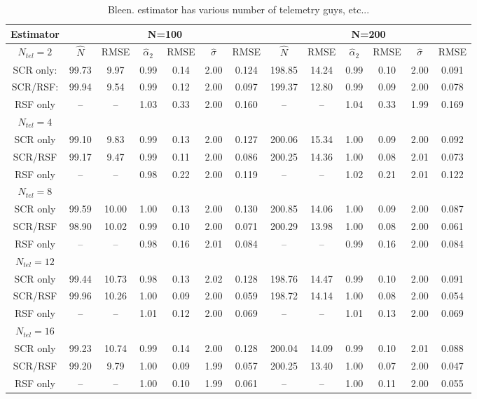 \documentclass[12pt]{article}
\begin{document}
{\tiny
\begin{table}
\centering
\caption{Bleen. estimator has various number of telemetry guys,  etc... }
\begin{tabular}{ccccccccccccc}
\hline \hline
Estimator &  \multicolumn{6}{c}{N=100} & \multicolumn{6}{c}{N=200} \\
\hline 
$N_{tel}=2$       &   $\hat{N}$ & RMSE & $\hat{\alpha}_{2}$& RMSE &
$\hat{\sigma}$ & RMSE & $\hat{N}$ & RMSE & $\hat{\alpha}_{2}$ & RMSE &
$\hat{\sigma}$ & RMSE \\ \hline
SCR only: &  99.73 & 9.97 & 0.99 & 0.14 & 2.00&  0.124& 198.85&14.24&0.99&   0.10& 2.00& 0.091 \\
SCR/RSF:  &  99.94 & 9.54 & 0.99 & 0.12 & 2.00&  0.097& 199.37&12.80&0.99&   0.09& 2.00& 0.078 \\
RSF only  &   --   & --   & 1.03 & 0.33 & 2.00&  0.160&   --  &   --&1.04&   0.33& 1.99& 0.169 \\
$N_{tel}=4$&        &      &      &      &     &       &       &      &    &       &     &      \\
SCR only  &  99.10 & 9.83 & 0.99 & 0.13 & 2.00&  0.127& 200.06& 15.34&1.00&   0.09& 2.00& 0.092\\
SCR/RSF   &  99.17 & 9.47 & 0.99 & 0.11 & 2.00&  0.086& 200.25& 14.36&1.00&   0.08& 2.01& 0.073\\
RSF only  &   --   &  --  & 0.98 & 0.22 & 2.00&  0.119&   --  &  --  &1.02&   0.21& 2.01& 0.122\\
$N_{tel}=8$&        &      &      &      &     &       &       &       &    &        &    &      \\
SCR only  &  99.59 & 10.00& 1.00 & 0.13 & 2.00&  0.130& 200.85& 14.06&1.00&   0.09& 2.00&   0.087\\
SCR/RSF   &  98.90 & 10.02&  0.99&  0.10& 2.00&  0.071& 200.29& 13.98&1.00&   0.08& 2.00&   0.061\\
RSF only  &   --   & --   & 0.98 & 0.16 & 2.01&  0.084&   --  &  --  &0.99&   0.16& 2.00&   0.084\\
$N_{tel}=12$&       &      &      &     &     &       &        &      &      &        &   &        \\
SCR only  &  99.44 &10.73 & 0.98 & 0.13 & 2.02&  0.128& 198.76& 14.47& 0.99&   0.10& 2.00&   0.091\\
SCR/RSF   &  99.96 &10.26 & 1.00 & 0.09 & 2.00&  0.059& 198.72& 14.14& 1.00&   0.08& 2.00&   0.054\\
RSF only  &   --   & --   & 1.01 & 0.12 & 2.00&  0.069&   --  &  --  & 1.01&   0.13& 2.00&   0.069\\
$N_{tel}=16$&        &      &      &     &     &       &       &      &     &       &       &      \\
SCR only  &  99.23 &10.74 & 0.99 & 0.14 & 2.00&  0.128& 200.04& 14.09&0.99&   0.10& 2.01&   0.088  \\
SCR/RSF   &  99.20 & 9.79 & 1.00 & 0.09 & 1.99&  0.057& 200.25& 13.40&1.00&   0.07& 2.00&   0.047 \\
RSF only  &   --   & --   & 1.00 & 0.10 & 1.99&  0.061&   --  &  --  &1.00&   0.11& 2.00&   0.055 \\
\end{tabular}
\label{tab.results1}
\end{table}
}
\end{document}
